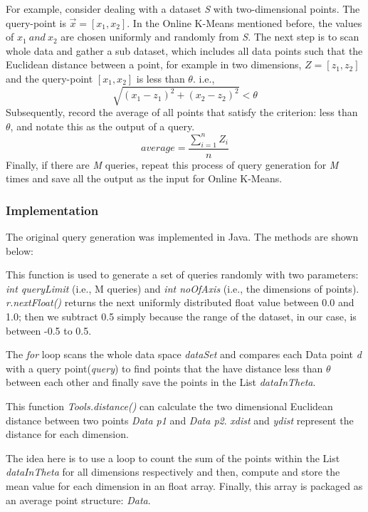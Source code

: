 \documentclass{lmproj}
\begin{document}
For example, consider dealing with a dataset \textit{S} with two-dimensional points. The query-point is $\vec{x} = [x_1,x_2] $. In the Online K-Means mentioned before, the values of $ x_1\ and\ x_2 $ are chosen uniformly and randomly from \textit{S}. The next step is to scan whole data and gather a sub dataset, which includes all data points such that the Euclidean distance between a point, for example in two dimensions, $ Z = [z_1,z_2]$ and the query-point $ [x_1,x_2] $ is less than  $ \theta $. i.e., $$ \sqrt{(x_1-z_1)^2 + (x_2-z_2)^2} < \theta $$ Subsequently, record the average of all points that satisfy the criterion: less than  $ \theta $, and notate this as the output of a query. $$ average = \frac{\sum_{i=1}^{n} Z_i}{n} $$ Finally, if there are \textit{M} queries, repeat this process of query generation for \textit{M} times and save all the output as the input for Online K-Means. 

\subsubsection{Implementation}
The original query generation was implemented in Java. The methods are shown below:



This function is used to generate a set of queries randomly with two parameters: \textit{int queryLimit} (i.e., M queries) and \textit{int noOfAxis} (i.e., the dimensions of points). \textit{r.nextFloat()} returns the next uniformly distributed float value between 0.0 and 1.0; then we subtract 0.5 simply because the range of the dataset, in our case, is between -0.5 to 0.5.


The \textit{for} loop scans the whole data space \textit{dataSet} and compares each Data point \textit{d} with a query point(\textit{query}) to find points that the have distance less than $ \theta $ between each other and finally save the points in the List \textit{dataInTheta}. 

This function \textit{Tools.distance()} can calculate the two dimensional Euclidean distance between two points \textit{Data p1} and \textit{Data p2}. \textit{xdist} and \textit{ydist} represent the distance for each dimension.

The idea here is to use a loop to count the sum of the points within the List \textit{dataInTheta} for all dimensions respectively and then, compute and store the mean value for each dimension in an float array. Finally, this array is packaged as an average point structure: \textit{Data}. 
\end{document}
